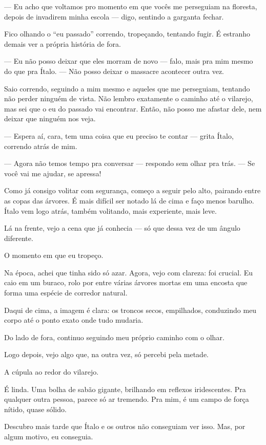 — Eu acho que voltamos pro momento em que vocês me perseguiam na floresta, depois de invadirem minha escola — digo, sentindo a garganta fechar.

Fico olhando o “eu passado” correndo, tropeçando, tentando fugir.  
É estranho demais ver a própria história de fora.

— Eu não posso deixar que eles morram de novo — falo, mais pra mim mesmo do que pra Ítalo. — Não posso deixar o massacre acontecer outra vez.

Saio correndo, seguindo a mim mesmo e aqueles que me perseguiam, tentando não perder ninguém de vista.  
Não lembro exatamente o caminho até o vilarejo, mas sei que o eu do passado vai encontrar.  
Então, não posso me afastar dele, nem deixar que ninguém nos veja.

— Espera aí, cara, tem uma coisa que eu preciso te contar — grita Ítalo, correndo atrás de mim.

— Agora não temos tempo pra conversar — respondo sem olhar pra trás. — Se você vai me ajudar, se apressa!

Como já consigo volitar com segurança, começo a seguir pelo alto, pairando entre as copas das árvores.  
É mais difícil ser notado lá de cima e faço menos barulho.  
Ítalo vem logo atrás, também volitando, mais experiente, mais leve.

Lá na frente, vejo a cena que já conhecia — só que dessa vez de um ângulo diferente.

O momento em que eu tropeço.

Na época, achei que tinha sido só azar.  
Agora, vejo com clareza: foi crucial.  
Eu caio em um buraco, rolo por entre várias árvores mortas em uma encosta que forma uma espécie de corredor natural.

Daqui de cima, a imagem é clara: os troncos secos, empilhados, conduzindo meu corpo até o ponto exato onde tudo mudaria.

Do lado de fora, continuo seguindo meu próprio caminho com o olhar.

Logo depois, vejo algo que, na outra vez, só percebi pela metade.

A cúpula ao redor do vilarejo.

É linda.  
Uma bolha de sabão gigante, brilhando em reflexos iridescentes.  
Pra qualquer outra pessoa, parece só ar tremendo.  
Pra mim, é um campo de força nítido, quase sólido.

Descubro mais tarde que Ítalo e os outros não conseguiam ver isso.  
Mas, por algum motivo, eu conseguia.

